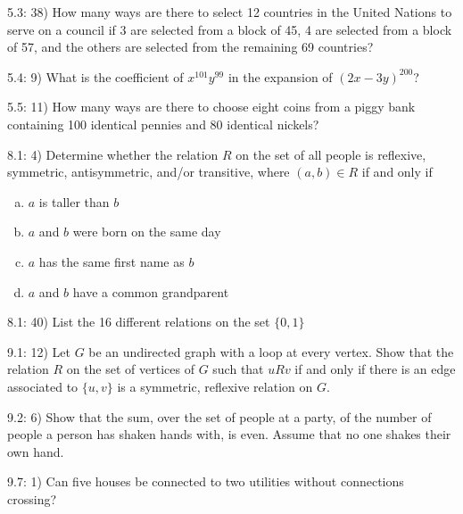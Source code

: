 \documentclass{report}
\begin{document}
5.3: 38) How many ways are there to select 12 countries in the United
Nations to serve on a council if 3 are selected from a block of 45, 4
are selected from a block of 57, and the others are selected from the
remaining 69 countries?

5.4: 9) What is the coefficient of $x^{101}y^{99}$ in the expansion of
$(2x-3y)^{200}$?

5.5: 11) How many ways are there to choose eight coins from a piggy
bank containing 100 identical pennies and 80 identical nickels?

8.1: 4) Determine whether the relation $R$ on the set of all people is reflexive, symmetric, antisymmetric, and/or transitive, where $(a,b) \in R$ if and only if

\begin{enumerate}[a)]
\item $a$ is taller than $b$
\item $a$ and $b$ were born on the same day
\item $a$ has the same first name as $b$
\item $a$ and $b$ have a common grandparent
\end{enumerate}

8.1: 40) List the 16 different relations on the set $\{0,1\}$

9.1: 12) Let $G$ be an undirected graph with a loop at every vertex.  Show that the relation $R$ on the set of vertices of $G$ such that $uRv$ if and only if there is an edge associated to $\{u,v\}$ is a symmetric, reflexive relation on $G$.

9.2: 6) Show that the sum, over the set of people at a party, of the number of people a person has shaken hands with, is even.  Assume that no one shakes their own hand.

9.7: 1) Can five houses be connected to two utilities without connections crossing?
\end{document}
